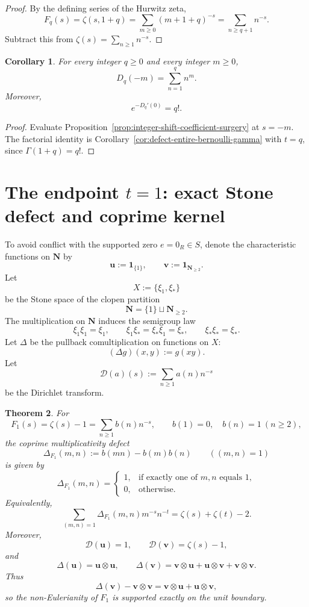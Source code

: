 \documentclass[11pt]{amsart}
\numberwithin{equation}{section}
\newtheorem{theorem}{Theorem}[section]
\newtheorem{corollary}[theorem]{Corollary}
\theoremstyle{definition}
\newcommand{\N}{\mathbf N}
\newcommand{\one}{\mathbf 1}
\begin{document}
\begin{proof}
By the defining series of the Hurwitz zeta,
\[
F_q(s)=\zeta(s,1+q)=\sum_{m\ge0}(m+1+q)^{-s}=\sum_{n\ge q+1}n^{-s}.
\]
Subtract this from $\zeta(s)=\sum_{n\ge1}n^{-s}$. 
\end{proof}

\begin{corollary}\label{cor:faulhaber-factorial}
For every integer $q\ge0$ and every integer $m\ge0$,
\[
D_q(-m)=\sum_{n=1}^{q}n^m.
\]
Moreover,
\[
e^{-D_q'(0)}=q!.
\]
\end{corollary}

\begin{proof}
Evaluate Proposition~\ref{prop:integer-shift-coefficient-surgery} at $s=-m$. The factorial identity is Corollary~\ref{cor:defect-entire-bernoulli-gamma} with $t=q$, since $\Gamma(1+q)=q!$. 
\end{proof}

\section{The endpoint $t=1$: exact Stone defect and coprime kernel}

To avoid conflict with the supported zero $e=0_R\in S$, denote the characteristic functions on $\N$ by
\[
\mathbf u:=\one_{\{1\}},
\qquad
\mathbf v:=\one_{\N_{\ge2}}.
\]
Let
\[
X:=\{\xi_1,\xi_\ast\}
\]
be the Stone space of the clopen partition
\[
\N=\{1\}\sqcup\N_{\ge2}.
\]
The multiplication on $\N$ induces the semigroup law
\[
\xi_1\xi_1=\xi_1,
\qquad
\xi_1\xi_\ast=\xi_\ast\xi_1=\xi_\ast,
\qquad
\xi_\ast\xi_\ast=\xi_\ast.
\]
Let $\Delta$ be the pullback comultiplication on functions on $X$:
\[
(\Delta g)(x,y):=g(xy).
\]
Let
\[
\mathcal D(a)(s):=\sum_{n\ge1}a(n)n^{-s}
\]
be the Dirichlet transform.

\begin{theorem}\label{thm:F1-defect-and-boundary}
For
\[
F_1(s)=\zeta(s)-1=\sum_{n\ge1}b(n)n^{-s},
\qquad
b(1)=0,
\quad
b(n)=1\ (n\ge2),
\]
the coprime multiplicativity defect
\[
\Delta_{F_1}(m,n):=b(mn)-b(m)b(n)
\qquad((m,n)=1)
\]
is given by
\[
\Delta_{F_1}(m,n)=
\begin{cases}
1,&\text{if exactly one of }m,n\text{ equals }1,\\[1mm]
0,&\text{otherwise.}
\end{cases}
\]
Equivalently,
\[
\sum_{(m,n)=1}\Delta_{F_1}(m,n)m^{-s}n^{-t}=\zeta(s)+\zeta(t)-2.
\]
Moreover,
\[
\mathcal D(\mathbf u)=1,
\qquad
\mathcal D(\mathbf v)=\zeta(s)-1,
\]
and
\[
\Delta(\mathbf u)=\mathbf u\otimes\mathbf u,
\qquad
\Delta(\mathbf v)=\mathbf v\otimes\mathbf u+\mathbf u\otimes\mathbf v+\mathbf v\otimes\mathbf v.
\]
Thus
\[
\Delta(\mathbf v)-\mathbf v\otimes\mathbf v
=
\mathbf v\otimes\mathbf u+\mathbf u\otimes\mathbf v,
\]
so the non-Eulerianity of $F_1$ is supported exactly on the unit boundary.
\end{theorem}
\end{document}
